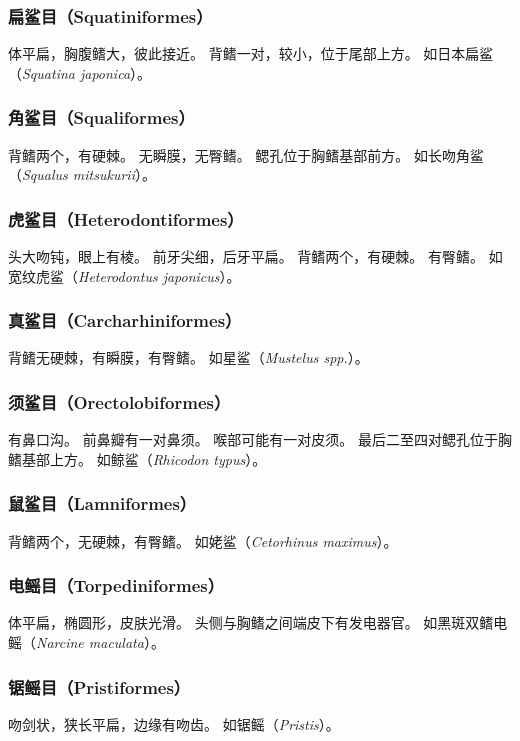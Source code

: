 \documentclass[11pt]{article}
\begin{document}
\subsubsection{扁鲨目（Squatiniformes）}
体平扁，胸腹鳍大，彼此接近。
背鳍一对，较小，位于尾部上方。
如日本扁鲨（\textit{Squatina japonica}）。

\subsubsection{角鲨目（Squaliformes）}
背鳍两个，有硬棘。
无瞬膜，无臀鳍。
鳃孔位于胸鳍基部前方。
如长吻角鲨（\textit{Squalus mitsukurii}）。

\subsubsection{虎鲨目（Heterodontiformes）}
头大吻钝，眼上有棱。
前牙尖细，后牙平扁。
背鳍两个，有硬棘。
有臀鳍。
如宽纹虎鲨（\textit{Heterodontus japonicus}）。

\subsubsection{真鲨目（Carcharhiniformes）}
背鳍无硬棘，有瞬膜，有臀鳍。
如星鲨（\textit{Mustelus spp.}）。

\subsubsection{须鲨目（Orectolobiformes）}
有鼻口沟。
前鼻瓣有一对鼻须。
喉部可能有一对皮须。
最后二至四对鳃孔位于胸鳍基部上方。
如鲸鲨（\textit{Rhicodon typus}）。

\subsubsection{鼠鲨目（Lamniformes）}
背鳍两个，无硬棘，有臀鳍。
如姥鲨（\textit{Cetorhinus maximus}）。

\subsubsection{电鳐目（Torpediniformes）}
体平扁，椭圆形，皮肤光滑。
头侧与胸鳍之间端皮下有发电器官。
如黑斑双鳍电鳐（\textit{Narcine maculata}）。

\subsubsection{锯鳐目（Pristiformes）}
吻剑状，狭长平扁，边缘有吻齿。
如锯鳐（\textit{Pristis}）。
\end{document}
